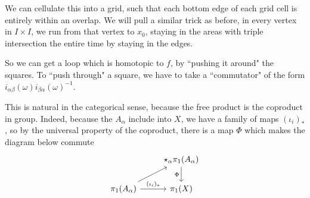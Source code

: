 \documentclass[x11names,reqno,14pt]{extarticle}
\begin{document}
\begin{enumerate}
We can cellulate this into a grid, such that each bottom edge of each grid cell is entirely within an overlap. We will pull a similar trick as before, in every vertex in $I \times I$, we run from that vertex to $x_0$, staying in the areas with triple intersection the entire time by staying in the edges.

So we can get a loop which is homotopic to $f$, by ``pushing it around" the squares. To ``push through" a square, we have to take a ``commutator" of the form $i_{\alpha\beta}(\omega)i_{\beta\alpha}(\omega)^{-1}$. 

\end{enumerate}

\rem

This is natural in the categorical sense, because the free product is the coproduct in group. Indeed, because the $A_\alpha$ include into $X$, we have a family of maps $(\iota_i)_*$, so by the universal property of the coproduct, there is a map $\Phi$ which makes the diagram below commute
\[
\begin{tikzcd}
& \star_\alpha\pi_1(A_\alpha)\ar[d, "\Phi"'] \\
\pi_1(A_\alpha)\ar[r, "(\iota_i)_*"] \ar[ur]& \pi_1(X)
\end{tikzcd}
\]
\end{document}

